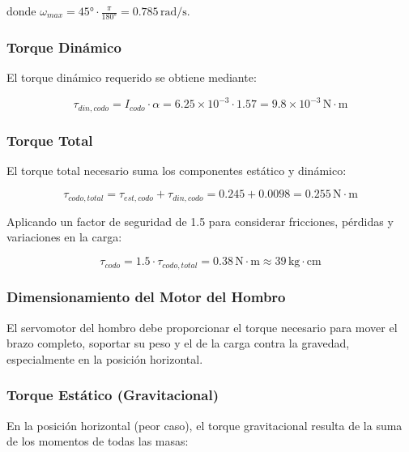 donde $\omega_{max} = 45° \cdot \frac{\pi}{180°} = 0.785 \, \text{rad/s}$.

\subsubsection{Torque Dinámico}

El torque dinámico requerido se obtiene mediante:

\begin{equation}
\tau_{din,codo} = I_{codo} \cdot \alpha = 6.25 \times 10^{-3} \cdot 1.57 = 9.8 \times 10^{-3} \, \text{N} \cdot \text{m}
\end{equation}

\subsubsection{Torque Total}

El torque total necesario suma los componentes estático y dinámico:

\begin{equation}
\tau_{codo,total} = \tau_{est,codo} + \tau_{din,codo} = 0.245 + 0.0098 = 0.255 \, \text{N} \cdot \text{m}
\end{equation}

Aplicando un factor de seguridad de 1.5 para considerar fricciones, pérdidas y variaciones en la carga:

\begin{equation}
\tau_{codo} = 1.5 \cdot \tau_{codo,total} = 0.38 \, \text{N} \cdot \text{m} \approx 39 \, \text{kg} \cdot \text{cm}
\end{equation}

\subsubsection{Dimensionamiento del Motor del Hombro}

El servomotor del hombro debe proporcionar el torque necesario para mover el brazo completo, soportar su peso y el de la carga contra la gravedad, especialmente en la posición horizontal.

\subsubsection{Torque Estático (Gravitacional)}

En la posición horizontal (peor caso), el torque gravitacional resulta de la suma de los momentos de todas las masas:

